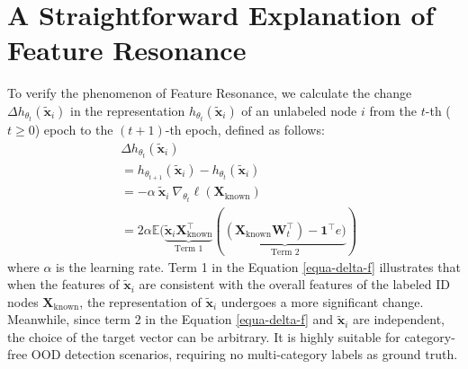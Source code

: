 \section{A Straightforward Explanation of Feature Resonance}
To verify the phenomenon of Feature Resonance, we calculate the change $\Delta h_{\theta_t}(\tilde{\mathbf{x}}_i)$ in the representation \( h_{\theta_t}(\tilde{\mathbf{x}}_i) \) of an unlabeled node $i$ from the \( t \)-th ($t \geq 0$) epoch to the $( t+1 )$-th epoch, defined as follows:
\begin{equation}\label{equa-delta-f}
\begin{split}
&\Delta h_{\theta_t}(\tilde{\mathbf{x}}_i) \\
&= h_{\theta_{t+1}}(\tilde{\mathbf{x}}_i) - h_{\theta_t}(\tilde{\mathbf{x}}_i)\\
&= -\alpha \ {\tilde{\mathbf{x}}_i \  \nabla_{\theta_t}\ell({\boldsymbol X}_{\text{known}})}\\
&=2\alpha\mathbb{E}(\underbrace{\tilde{\mathbf{x}}_i{\boldsymbol X}_{\text{known}}^{\top}}_{\text{Term 1}}(\underbrace{({\boldsymbol X}_{\text{known}}\mathbf{W}^{\top}_t)-\mathbf{1}^{\top}e)}_{\text{Term 2}}) 
\end{split}
\end{equation}
where \( \alpha \) is the learning rate. 
Term 1 in the Equation \ref{equa-delta-f} illustrates that when the features of \( \tilde{\mathbf{x}}_i \) are consistent with the overall features of the labeled ID nodes ${\boldsymbol X}_{\text{known}}$, the representation of \( \tilde{\mathbf{x}}_i \) undergoes a more significant change.
Meanwhile, since term 2 in the Equation \ref{equa-delta-f} and $\tilde{\mathbf{x}}_i$ are independent, the choice of the target vector can be arbitrary. It is highly suitable for category-free OOD detection scenarios, requiring no multi-category labels as ground truth. 


